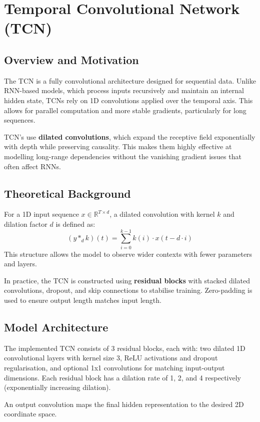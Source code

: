 \section{Temporal Convolutional Network (TCN)}

\subsection*{Overview and Motivation}
The TCN is a fully convolutional architecture designed for sequential data. Unlike RNN-based models, which process inputs recursively and maintain an internal hidden state, TCNs rely on 1D convolutions applied over the temporal axis. This allows for parallel computation and more stable gradients, particularly for long sequences.

TCN's use \textbf{dilated convolutions}, which expand the receptive field exponentially with depth while preserving causality. This makes them highly effective at modelling long-range dependencies without the vanishing gradient issues that often affect RNNs.

\subsection*{Theoretical Background}
For a 1D input sequence $x \in \mathbb{R}^{T \times d}$, a dilated convolution with kernel $k$ and dilation factor $d$ is defined as:
\[
(y *_{d} k)(t) = \sum_{i=0}^{k-1} k(i) \cdot x(t - d \cdot i)
\]
This structure allows the model to observe wider contexts with fewer parameters and layers.

In practice, the TCN is constructed using \textbf{residual blocks} with stacked dilated convolutions, dropout, and skip connections to stabilise training. Zero-padding is used to ensure output length matches input length.

\subsection*{Model Architecture}
The implemented TCN consists of 3 residual blocks, each with: two dilated 1D convolutional layers with kernel size 3, ReLU activations and dropout regularisation, and optional 1x1 convolutions for matching input-output dimensions. Each residual block has a dilation rate of 1, 2, and 4 respectively (exponentially increasing dilation).

An output convolution maps the final hidden representation to the desired 2D coordinate space.

